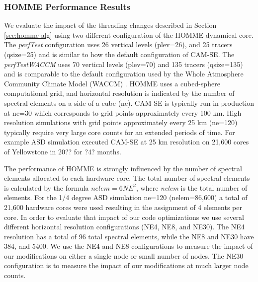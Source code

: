 \subsubsection{HOMME Performance Results}\label{sec:homme-results}

We evaluate the impact of the threading changes described in Section \ref{sec:homme-alg} using two different configuration of the HOMME dynamical core.  The {\em perfTest} configuration uses 26 vertical levels (plev=26), and 25 tracers (qsize=25) and is similar to how the default configuration of CAM-SE.  The {\em perfTestWACCM} uses 70 vertical levels (plev=70) and 135 tracers (qsize=135) and is comparable to the default configuration used by the Whole Atmosphere Community Climate Model (WACCM) \cite{waccm}.  HOMME uses a cubed-sphere computational grid, and horizontal resolution is indicated by the number of spectral elements on a side of a cube (ne). CAM-SE is typically run in production at ne=30 which corresponds to grid points approximately every 100 km.  High resolution simulations with grid points approximately every 25 km (ne=120) typically require very large core counts for an extended periods of time.   For example ASD simulation \cite{small2014} executed CAM-SE at 25 km resolution on 21,600 cores of Yellowstone in 20?? for ?4? months.

The performance of HOMME is strongly influenced by the number of spectral elements allocated to each hardware core.  The total number of spectral elements is calculated by the formula $nelem= 6 NE^2$, where {\em nelem} is the total number of elements.   For the 1/4 degree ASD simulation \cite{small2014} ne=120 (nelem=86,600) a total of 21,600 hardware cores were used resulting in the assignment of 4 elements per core. In order to evaluate that impact of our code optimizations we use several different horizontal resolution configurations (NE4, NE8, and NE30). The NE4 resolution has a total of 96 total spectral elements, while the NE8 and NE30 have 384, and 5400.  We use the NE4 and NE8 configurations to measure the impact of our modifications on either a single node or small number of nodes.  The NE30 configuration is to measure the impact of our modifications at much larger node counts.  



